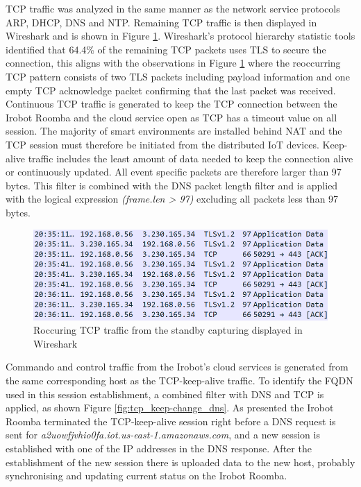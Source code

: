 \gls{TCP} traffic was analyzed in the same manner as the network service protocols \gls{ARP}, DHCP, \gls{DNS} and \gls{NTP}. Remaining \gls{TCP} traffic is then displayed in Wireshark and is shown in Figure \ref{fig:tcp_keep-alive}. Wireshark's protocol hierarchy statistic tools identified that 64.4\% of the remaining \gls{TCP} packets uses \gls{TLS} to secure the connection, this aligns with the observations in Figure \ref{fig:tcp_keep-alive} where the reoccurring \gls{TCP} pattern consists of two \gls{TLS} packets including payload information and one empty \gls{TCP} acknowledge packet confirming that the last packet was received. Continuous \gls{TCP} traffic is generated to keep the \gls{TCP} connection between the Irobot Roomba and the cloud service open as \gls{TCP} has a timeout value on all session. The majority of smart environments are installed behind \gls{NAT} and the \gls{TCP} session must therefore be initiated from the distributed \gls{IoT} devices.  Keep-alive traffic includes the least amount of data needed to keep the connection alive or continuously updated. All event specific packets are therefore larger than 97 bytes.  This filter is combined with the \gls{DNS} packet length filter and is applied with the logical expression \textit{(frame.len > 97)} excluding all packets less than 97 bytes.

\begin{figure}[H]
    \centering
    \includegraphics[width=\textwidth]{figures/tcp_keep-alive.png}
    \caption{Roccuring \gls{TCP} traffic from the standby capturing displayed in Wireshark}
    \label{fig:tcp_keep-alive}
\end{figure}

Commando and control traffic from the Irobot's cloud services is generated from the same corresponding host as the TCP-keep-alive traffic. To identify the \gls{FQDN} used in this session establishment, a combined filter with \gls{DNS} and \gls{TCP} is applied, as shown Figure \ref{fig:tcp_keep-change_dns}. As presented the Irobot Roomba terminated the \gls{TCP}-keep-alive session right before a \gls{DNS} request is sent for \textit{a2uowfjvhio0fa.iot.us-east-1.amazonaws.com}, and a new session is established with one of the \gls{IP} addresses in the \gls{DNS} response. After the establishment of the new session there is uploaded data to the new host, probably synchronising and updating current status on the Irobot Roomba.

